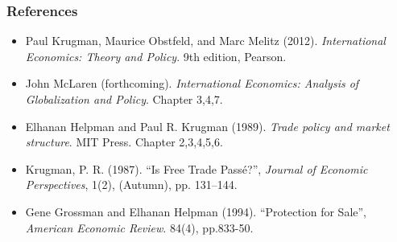 \documentclass[11pt,onesided]{article}
\begin{document}
\newpage
\subsubsection*{References} \small{ 
\begin{itemize}
	
	\item [] Paul Krugman, Maurice Obstfeld, and Marc Melitz  (2012). \emph{International Economics: Theory and Policy}. 9th edition, Pearson. 
	\item [] John McLaren (forthcoming). \emph{International Economics: Analysis of Globalization and Policy}. Chapter 3,4,7. 
		\item [] Elhanan Helpman and Paul R. Krugman (1989). \emph{Trade policy and market structure}. MIT Press. Chapter 2,3,4,5,6.
	\item [] Krugman, P. R. (1987). ``Is Free Trade Pass\'{e}?'', \emph{Journal of Economic Perspectives}, 1(2), (Autumn), pp. 131–144.
	\item  [] Gene Grossman and Elhanan Helpman (1994). ``Protection for Sale'', \emph{American Economic Review}. 84(4), pp.833-50.
	
	
	
	
	
	
\end{itemize}
}

%
\end{document}
